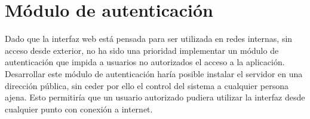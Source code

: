 \section*{Módulo de autenticación}

Dado que la interfaz web está pensada para ser utilizada en redes internas, sin acceso desde exterior, no ha sido una prioridad implementar un módulo de autenticación que impida a usuarios no autorizados el acceso a la aplicación. Desarrollar este módulo de autenticación haría posible instalar el servidor en una dirección pública, sin ceder por ello el control del sistema a cualquier persona ajena. Esto permitiría que un usuario autorizado pudiera utilizar la interfaz desde cualquier punto con conexión a internet.

